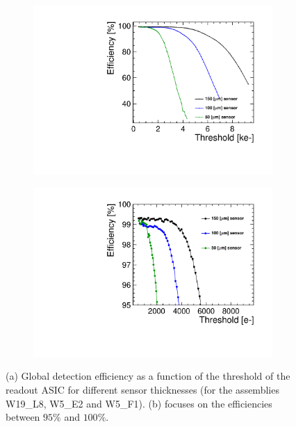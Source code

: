 \begin{figure}[htbp] 
  \centering
  \begin{subfigure}[b]{0.45\textwidth}
    \includegraphics[width=\textwidth]{./figures/TestBeam/Efficiency_vs_THL.pdf}
    \caption{}
  \end{subfigure}\hfill
  \begin{subfigure}[b]{0.45\textwidth}
    \includegraphics[width=\textwidth]{./figures/TestBeam/Efficiency_vs_THL_zoom.pdf}
    \caption{}
  \end{subfigure}
  \caption{(a) Global detection efficiency as a function of the
    threshold of the readout ASIC for different sensor thicknesses
    (for the assemblies W19\_L8, W5\_E2 and W5\_F1). (b) focuses on
    the efficiencies between $95\%$ and $100\%$.}
  \label{fig:efficiency_VS_Threshold}
\end{figure}

